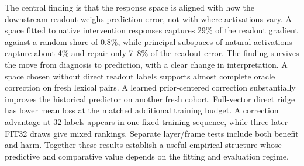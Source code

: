 \documentclass[11pt]{article}
\begin{document}
The central finding is that the response space is aligned with how the downstream readout weighs prediction error, not with where activations vary. A space fitted to native intervention responses captures 29\% of the readout gradient against a random share of 0.8\%, while principal subspaces of natural activations capture about 4\% and repair only 7--8\% of the readout error. The finding survives the move from diagnosis to prediction, with a clear change in interpretation. A space chosen without direct readout labels supports almost complete oracle correction on fresh lexical pairs. A learned prior-centered correction substantially improves the historical predictor on another fresh cohort. Full-vector direct ridge has lower mean loss at the matched additional training budget. A correction advantage at 32 labels appears in one fixed training sequence, while three later FIT32 draws give mixed rankings. Separate layer/frame tests include both benefit and harm. Together these results establish a useful empirical structure whose predictive and comparative value depends on the fitting and evaluation regime.
\end{document}
